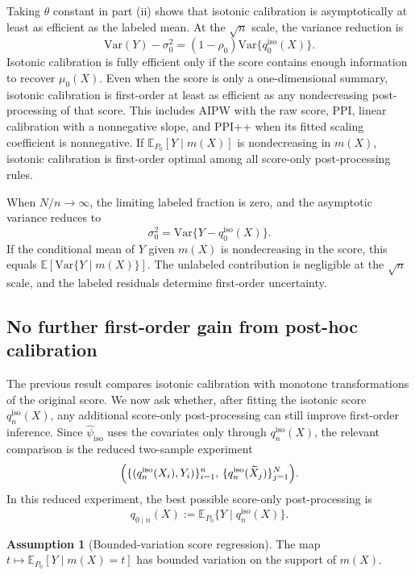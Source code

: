 \documentclass{article}
\theoremstyle{plain}
\theoremstyle{definition}
\newtheorem{assumption}{Assumption}
\newcommand{\E}{\mathbb{E}}
\newcommand{\Var}{\mathrm{Var}}
\newcommand{\1}{\mathbf{1}}
\newcommand{\mhat}{m}
\newcommand{\rhozero}{\rho_0}
\newcommand{\muzero}{\mu_0}
\begin{document}
Taking \(\theta\) constant in part (ii) shows that isotonic calibration is
asymptotically at least as efficient as the labeled mean.
At the \(\sqrt n\) scale, the variance reduction is
\[\Var(Y)-\sigma_0^2=(1-\rhozero)\Var\{q_0^{\mathrm{iso}}(X)\}.\]
Isotonic calibration is fully efficient only if the score
contains enough information to recover \(\muzero(X)\). Even when the score is
only a one-dimensional summary, isotonic calibration is first-order at least as
efficient as any nondecreasing post-processing of that score. This includes
AIPW with the raw score, PPI, linear calibration with a nonnegative slope, and
PPI++ when its fitted scaling coefficient is nonnegative. If
\(\E_{P_0}[Y\mid \mhat(X)]\) is nondecreasing in \(\mhat(X)\), isotonic calibration is
first-order optimal among all score-only post-processing rules.

When \(N/n\to\infty\), the limiting labeled fraction is zero, and the
asymptotic variance reduces to
\[
\sigma_0^2=\Var\{Y-q_0^{\mathrm{iso}}(X)\}.
\]
If the conditional mean of \(Y\) given \(m(X)\) is nondecreasing in the
score, this equals \(\E[\Var\{Y\mid m(X)\}]\). The unlabeled contribution
is negligible at the \(\sqrt n\) scale, and the labeled residuals determine
first-order uncertainty.

\subsection{No further first-order gain from post-hoc calibration}

The previous result compares isotonic calibration with monotone transformations
of the original score. We now ask whether, after fitting the isotonic score
\(q_n^{\mathrm{iso}}(X)\), any additional score-only post-processing can
still improve first-order inference. Since \(\widehat\psi_{\mathrm{iso}}\) uses
the covariates only through \(q_n^{\mathrm{iso}}(X)\), the relevant
comparison is the reduced two-sample experiment
\[
\Bigl(
\{(q_n^{\mathrm{iso}}(X_i),Y_i)\}_{i=1}^n,\,
\{q_n^{\mathrm{iso}}(\widetilde X_j)\}_{j=1}^N
\Bigr).
\]
In this reduced experiment, the best possible score-only post-processing is
\[
q_{0\mid n}(X)
:=
\E_{P_0}\{Y\mid q_n^{\mathrm{iso}}(X)\}.
\]

\begin{assumption}[Bounded-variation score regression]
\label{assump:eff-bv}
The map \(t\mapsto \E_{P_0}[Y\mid \mhat(X)=t]\) has bounded variation on the support
of \(\mhat(X)\).
\end{assumption}
\end{document}
